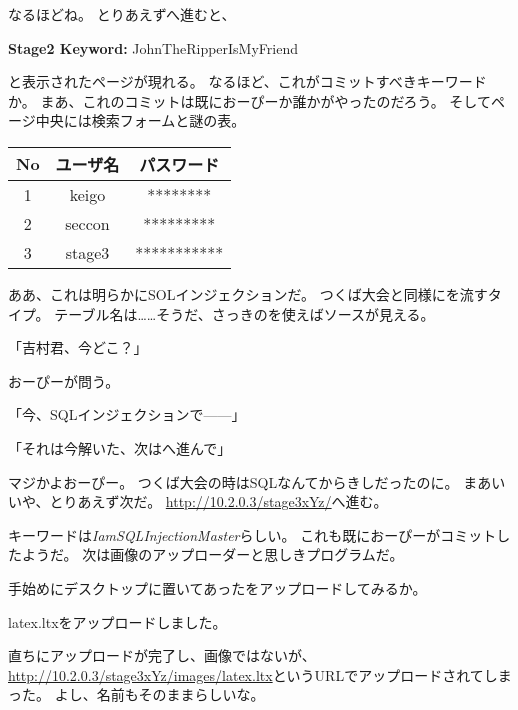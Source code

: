 なるほどね。
とりあえずへ進むと、

\begin{screen}
\centering
\textbf{Stage2 Keyword:} JohnTheRipperIsMyFriend 
\end{screen}

と表示されたページが現れる。
なるほど、これがコミットすべきキーワードか。
まあ、これのコミットは既におーぴーか誰かがやったのだろう。
そしてページ中央には検索フォームと謎の表。

\begin{table}[H]
	\centering
	\begin{tabular}{|c|c|c|}
		\hline
		\textbf{No} & \textbf{ユーザ名} & \textbf{パスワード} \\ \hline
		1 & keigo & ******** \\ \hline
		2 & seccon & ********* \\ \hline
		3 & stage3 & *********** \\ \hline
	\end{tabular}
\end{table}

ああ、これは明らかにSOLインジェクションだ。
つくば大会と同様にを流すタイプ。
テーブル名は……そうだ、さっきのを使えばソースが見える。

「吉村君、今どこ？」

おーぴーが問う。

「今、SQLインジェクションで------」

「それは今解いた、次はへ進んで」

マジかよおーぴー。
つくば大会の時はSQLなんてからきしだったのに。
まあいいや、とりあえず次だ。
\url{http://10.2.0.3/stage3xYz/}へ進む。



キーワードは\textit{IamSQLInjectionMaster}らしい。
これも既におーぴーがコミットしたようだ。
次は画像のアップローダーと思しきプログラムだ。

手始めにデスクトップに置いてあったをアップロードしてみるか。

\begin{screen}
\centering
latex.ltxをアップロードしました。
\end{screen}

直ちにアップロードが完了し、画像ではないが、
\url{http://10.2.0.3/stage3xYz/images/latex.ltx}というURLでアップロードされてしまった。
よし、名前もそのままらしいな。

